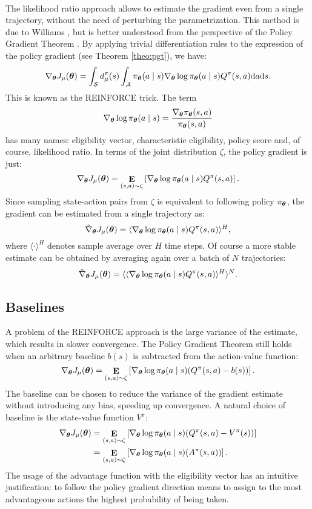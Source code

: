 \paragraph{} %
The likelihood ratio approach allows to estimate the gradient even from a single trajectory, without the need of perturbing the parametrization. This method is due to Williams \cite{Williams1992}, but is better understood from the perspective of the Policy Gradient Theorem \cite{Sutton1999a}.
By applying trivial differentiation rules to the expression of the policy gradient (see Theorem \ref{theo:pgt}), we have:
\[
	\nabla_{\boldsymbol{\theta}}J_\mu(\boldsymbol{\theta}) = \int_{\mathcal{S}}d_{\mu}^{\pi}(s)
		\int_{\mathcal{A}}\pi_{\boldsymbol{\theta}}(a \mid s)\nabla_{\boldsymbol{\theta}}\log\pi_{\boldsymbol{\theta}}(a \mid s)
		Q^{\pi}(s,a)\mathrm{d}a\mathrm{d}s.
\]
This is known as the REINFORCE trick. The term
\[
	\nabla_{\boldsymbol{\theta}}\log\pi_{\boldsymbol{\theta}}(a \mid s) = \frac{\nabla_{\boldsymbol{\theta}}\pi_{\boldsymbol{\theta}}(s,a)}{\pi_{\boldsymbol{\theta}}(s,a)}
\]
has many names: eligibility vector, characteristic eligibility, policy score and, of course, likelihood ratio.
In terms of the joint distribution $\zeta$, the policy gradient is just:
\[
	\nabla_{\boldsymbol{\theta}}J_\mu(\boldsymbol{\theta}) = \mathop{\mathbf{E}}_{(s,a)\sim\zeta}\left[\nabla_{\boldsymbol{\theta}}\log\pi_{\boldsymbol{\theta}}(a \mid s) Q^{\pi}(s,a)\right].
\]
Since sampling state-action pairs from $\zeta$ is equivalent to following policy $\pi_{\boldsymbol{\theta}}$, the gradient can be estimated from a single trajectory as:
\[
	\tilde{\nabla}_{\boldsymbol{\theta}}J_{\mu}(\boldsymbol{\theta}) = \langle\nabla_{\boldsymbol{\theta}}\log\pi_{\boldsymbol{\theta}}(a \mid s) Q^{\pi}(s,a)\rangle^H,
\]
where $\langle\cdot\rangle^H$ denotes sample average over $H$ time steps. Of course a more stable estimate can be obtained by averaging again over a batch of $N$ trajectories:
\[
	\hat{\nabla}_{\boldsymbol{\theta}}J_{\mu}(\boldsymbol{\theta}) = \langle\langle\nabla_{\boldsymbol{\theta}}\log\pi_{\boldsymbol{\theta}}(a \mid s) Q^{\pi}(s,a)\rangle^H\rangle^N.
\]

\subsection{Baselines}
A problem of the REINFORCE approach is the large variance of the estimate, which results in slower convergence.
The Policy Gradient Theorem still holds when an arbitrary baseline $b(s)$ is subtracted from the action-value function:
\[
	\nabla_{\boldsymbol{\theta}}J_\mu(\boldsymbol{\theta}) = \mathop{\mathbf{E}}_{(s,a)\sim\zeta}
		\left[\nabla_{\boldsymbol{\theta}}\log\pi_{\boldsymbol{\theta}}(a \mid s) (Q^{\pi}(s,a) - b(s))\right].
\]
The baseline can be chosen to reduce the variance of the gradient estimate without introducing any bias, speeding up convergence. A natural choice of baseline is the state-value function $V^{\pi}$:
\begin{align*}
	\nabla_{\boldsymbol{\theta}}J_\mu(\boldsymbol{\theta}) &= \mathop{\mathbf{E}}_{(s,a)\sim\zeta}
		\left[\nabla_{\boldsymbol{\theta}}\log\pi_{\boldsymbol{\theta}}(a \mid s) (Q^{\pi}(s,a) - V^{\pi}(s))\right] \\
		&= \mathop{\mathbf{E}}_{(s,a)\sim\zeta}
				\left[\nabla_{\boldsymbol{\theta}}\log\pi_{\boldsymbol{\theta}}(a \mid s) (A^{\pi}(s,a))\right].
\end{align*}
The usage of the advantage function with the eligibility vector has an intuitive justification: to follow the policy gradient direction means to assign to the most advantageous actions the highest probability of being taken. 

